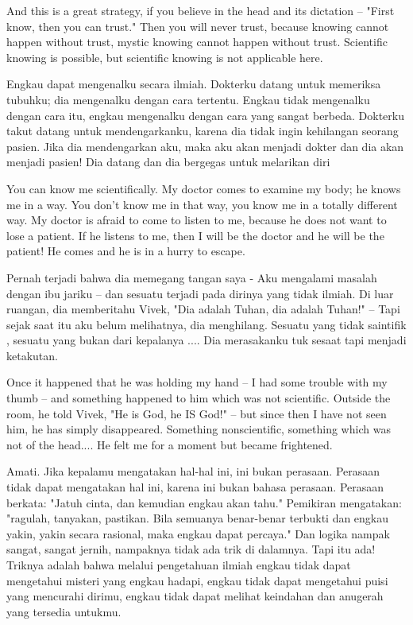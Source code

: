 \english
And this is a great strategy, if you believe in the head and its dictation -- "First know, then you can trust." Then you will never trust, because knowing cannot happen without trust, mystic knowing cannot happen without trust. Scientific knowing is possible, but scientific knowing is not applicable here.

\bahasa
Engkau dapat mengenalku secara ilmiah. Dokterku datang untuk memeriksa tubuhku; dia mengenalku dengan cara tertentu. Engkau tidak mengenalku dengan cara itu, engkau mengenalku dengan cara yang sangat berbeda. Dokterku takut datang untuk mendengarkanku, karena dia tidak ingin kehilangan seorang pasien. Jika dia mendengarkan aku, maka aku akan menjadi dokter dan dia akan menjadi pasien! Dia datang dan dia bergegas untuk melarikan diri

\english
You can know me scientifically. My doctor comes to examine my body; he knows me in a way. You don't know me in that way, you know me in a totally different way. My doctor is afraid to come to listen to me, because he does not want to lose a patient. If he listens to me, then I will be the doctor and he will be the patient! He comes and he is in a hurry to escape.

\bahasa
Pernah terjadi bahwa dia memegang tangan saya - Aku mengalami masalah dengan ibu jariku -- dan sesuatu terjadi pada dirinya yang tidak ilmiah. Di luar ruangan, dia memberitahu Vivek, "Dia adalah Tuhan, dia adalah Tuhan!" -- Tapi sejak saat itu aku belum melihatnya, dia menghilang. Sesuatu yang tidak saintifik , sesuatu yang bukan dari kepalanya .... Dia merasakanku tuk sesaat tapi menjadi ketakutan.

\english
Once it happened that he was holding my hand -- I had some trouble with my thumb -- and something happened to him which was not scientific. Outside the room, he told Vivek, "He is God, he IS God!" -- but since then I have not seen him, he has simply disappeared. Something nonscientific, something which was not of the head.... He felt me for a moment but became frightened.

\bahasa
Amati. Jika kepalamu mengatakan hal-hal ini, ini bukan perasaan. Perasaan tidak dapat mengatakan hal ini, karena ini bukan bahasa perasaan. Perasaan berkata: "Jatuh cinta, dan kemudian engkau akan tahu." Pemikiran mengatakan: "ragulah, tanyakan, pastikan. Bila semuanya benar-benar terbukti dan engkau yakin, yakin secara rasional, maka engkau dapat percaya." Dan logika nampak sangat, sangat jernih, nampaknya tidak ada trik di dalamnya. Tapi itu ada! Triknya adalah bahwa melalui pengetahuan ilmiah engkau tidak dapat mengetahui misteri yang engkau hadapi, engkau tidak dapat mengetahui puisi yang mencurahi dirimu, engkau tidak dapat melihat keindahan dan anugerah yang tersedia untukmu.

